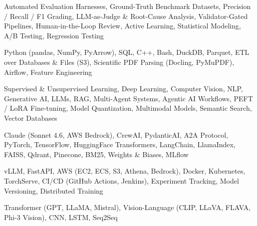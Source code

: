\documentclass[letter,10pt]{article}
\begin{document}
 Automated Evaluation Harnesses, Ground-Truth Benchmark Datasets, Precision / Recall / F1 Grading, LLM-as-Judge \& Root-Cause Analysis, Validator-Gated Pipelines, Human-in-the-Loop Review, Active Learning, Statistical Modeling, A/B Testing, Regression Testing\par\vspace{2pt}

 Python (pandas, NumPy, PyArrow), SQL, C++, Bash, DuckDB, Parquet, ETL over Databases \& Files (S3), Scientific PDF Parsing (Docling, PyMuPDF), Airflow, Feature Engineering\par\vspace{2pt}

 Supervised \& Unsupervised Learning, Deep Learning, Computer Vision, NLP, Generative AI, LLMs, RAG, Multi-Agent Systems, Agentic AI Workflows, PEFT / LoRA Fine-tuning, Model Quantization, Multimodal Models, Semantic Search, Vector Databases\par\vspace{2pt}

 Claude (Sonnet 4.6, AWS Bedrock), CrewAI, PydanticAI, A2A Protocol, PyTorch, TensorFlow, HuggingFace Transformers, LangChain, LlamaIndex, FAISS, Qdrant, Pinecone, BM25, Weights \& Biases, MLflow\par\vspace{2pt}

 vLLM, FastAPI, AWS (EC2, ECS, S3, Athena, Bedrock), Docker, Kubernetes, TorchServe, CI/CD (GitHub Actions, Jenkins), Experiment Tracking, Model Versioning, Distributed Training\par\vspace{2pt}

 Transformer (GPT, LLaMA, Mistral), Vision-Language (CLIP, LLaVA, FLAVA, Phi-3 Vision), CNN, LSTM, Seq2Seq
\end{document}
